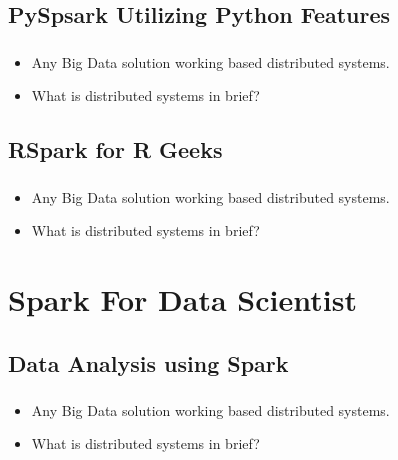 \subsection{PySpsark Utilizing Python Features}

\begin{frame}
  \frametitle{\subsecname}
	\begin{itemize}[<+->]
		\item Any Big Data solution working based distributed systems.
		\item What is distributed systems in brief?
	\end{itemize}
\end{frame}

\subsection{RSpark for R Geeks}

\begin{frame}
  \frametitle{\subsecname}
	\begin{itemize}[<+->]
		\item Any Big Data solution working based distributed systems.
		\item What is distributed systems in brief?
	\end{itemize}
\end{frame}


\section{Spark For Data Scientist}



\subsection{Data Analysis using Spark}

\begin{frame}
  \frametitle{\subsecname}
	\begin{itemize}[<+->]
		\item Any Big Data solution working based distributed systems.
		\item What is distributed systems in brief?
	\end{itemize}
\end{frame}

